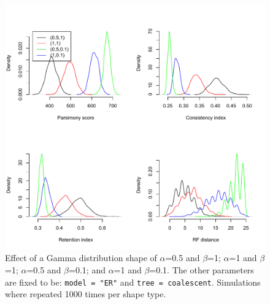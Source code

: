 \documentclass{article}\usepackage[]{graphicx}\usepackage[]{color}
\begin{document}
\begin{figure}[!htbp]
\centering
   \includegraphics[width=1\textwidth]{Gamma_effect.pdf}
\caption{Effect of a Gamma distribution shape of $\alpha$=0.5 and $\beta$=1; $\alpha$=1 and $\beta$=1; $\alpha$=0.5 and $\beta$=0.1; and $\alpha$=1 and $\beta$=0.1.
The other parameters are fixed to be: \texttt{model = "ER"} and \texttt{tree = coalescent}.
Simulations where repeated 1000 times per shape type.}
\label{Gamma_effect}
\end{figure}



\end{document}

